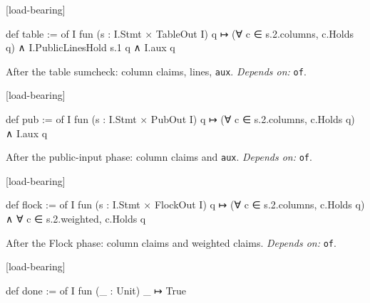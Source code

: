 \par\medskip\noindent\textbf{}\hfill\textsf{\small [load-bearing]}\par\nopagebreak

\begin{leancode}
def table := of I fun (s : I.Stmt × TableOut I) q ↦
  (∀ c ∈ s.2.columns, c.Holds q) ∧ I.PublicLinesHold s.1 q ∧ I.aux q
\end{leancode}


After the table sumcheck: column claims, lines, \texttt{aux}. \emph{Depends on:} \texttt{of}.

\par\medskip\noindent\textbf{}\hfill\textsf{\small [load-bearing]}\par\nopagebreak

\begin{leancode}
def pub := of I fun (s : I.Stmt × PubOut I) q ↦ (∀ c ∈ s.2.columns, c.Holds q) ∧ I.aux q
\end{leancode}


After the public-input phase: column claims and \texttt{aux}. \emph{Depends on:} \texttt{of}.

\par\medskip\noindent\textbf{}\hfill\textsf{\small [load-bearing]}\par\nopagebreak

\begin{leancode}
def flock := of I fun (s : I.Stmt × FlockOut I) q ↦
  (∀ c ∈ s.2.columns, c.Holds q) ∧ ∀ c ∈ s.2.weighted, c.Holds q
\end{leancode}


After the Flock phase: column claims and weighted claims. \emph{Depends on:} \texttt{of}.

\par\medskip\noindent\textbf{}\hfill\textsf{\small [load-bearing]}\par\nopagebreak

\begin{leancode}
def done := of I fun (_ : Unit) _ ↦ True
\end{leancode}


